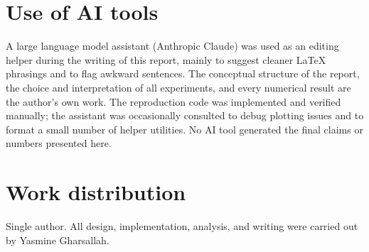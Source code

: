\documentclass{article}
\begin{document}
\section*{Use of AI tools}

A large language model assistant (Anthropic Claude) was used as an editing helper during the writing of this report, mainly to suggest cleaner LaTeX phrasings and to flag awkward sentences. The conceptual structure of the report, the choice and interpretation of all experiments, and every numerical result are the author's own work. The reproduction code was implemented and verified manually; the assistant was occasionally consulted to debug plotting issues and to format a small number of helper utilities. No AI tool generated the final claims or numbers presented here.

\section*{Work distribution}

Single author. All design, implementation, analysis, and writing were carried out by Yasmine Gharsallah.
\end{document}
